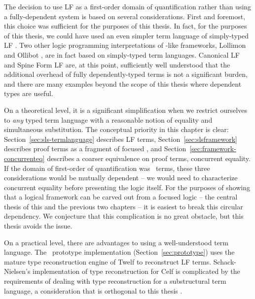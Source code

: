 The decision to use LF as a first-order domain of quantification
rather than using a fully-dependent system is based on several
considerations. First and foremost, this choice was sufficient for the
purposes of this thesis. In fact, for the purposes of this thesis, we
could have used an even simpler term language of simply-typed LF
\cite{pfenning08church}. Two other logic programming interpretations
of \sls-like frameworks, Lollimon \cite{lopez05monadic} and Ollibot
\cite{pfenning09substructural}, are in fact based on simply-typed term
languages. Canonical LF and Spine Form LF are, at this point,
sufficiently well understood that the additional overhead of fully
dependently-typed terms is not a significant burden, and there are
many examples beyond the scope of this thesis where dependent types are
useful.

On a theoretical level, it is a significant simplification when we
restrict ourselves to {\it any} typed term language with a reasonable
notion of equality and simultaneous substitution. The conceptual
priority in this chapter is clear: Section~\ref{sec:sls-termlanguage}
describes LF terms, Section~\ref{sec:slsframework} describes proof
terms as a fragment of focused \ollll, and
Section~\ref{sec:framework-concurrenteq} describes a coarser
equivalence on proof terms, concurrent equality. If the domain of
first-order of quantification was \sls~terms, these three
considerations would be mutually dependent -- we would need to
characterize concurrent equality before presenting the logic
itself. For the purposes of showing that a logical framework can be
carved out from a focused logic -- the central thesis of this and the
previous two chapters -- it is easiest to break this circular
dependency. We conjecture that this complication is no great obstacle,
but this thesis avoids the issue.

On a practical level, there are advantages to using a well-understood
term language. The \sls~prototype implementation
(Section~\ref{sec:prototype}) uses the mature type reconstruction
engine of Twelf to reconstruct LF terms. Schack-Nielsen's
implementation of type reconstruction for Celf is complicated by the
requirements of dealing with type reconstruction for a substructural
term language, a consideration that is orthogonal to this
thesis \cite{schacknielsen08celf}. 

